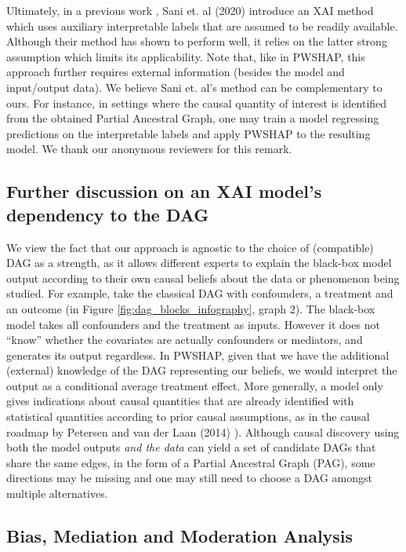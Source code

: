 \documentclass{article}
\theoremstyle{plain}
\theoremstyle{definition}
\theoremstyle{remark}
\theoremstyle{mystyle}
\begin{document}
Ultimately, in a previous work , Sani et. al  (2020) introduce an XAI method which uses auxiliary interpretable labels that are assumed to be readily available. Although their method has shown to perform well, it relies on the latter strong assumption which limits its applicability. Note that, like in PWSHAP, this approach further requires external information (besides the model and input/output data). We believe Sani et. al's method can be complementary to ours. For instance, in settings where the causal quantity of interest is identified from the obtained Partial Ancestral Graph, one may train a model regressing predictions on the interpretable labels and apply PWSHAP to the resulting model. We thank our anonymous reviewers for this remark.

\subsection{Further discussion on an XAI model's dependency to the DAG} 
\label{subsec:further_dag}

We view the fact that our approach is agnostic to the choice of (compatible) DAG as a strength, as it allows different experts to explain the black-box model output according to their own causal beliefs about the data or phenomenon being studied.
For example, take the classical DAG with confounders, a treatment and an outcome (in Figure \ref{fig:dag_blocks_infography}, graph 2). The black-box model takes all confounders and the treatment as inputs. However it does not ``know'' whether the covariates are actually confounders or mediators, and generates its output regardless. In PWSHAP, given that we have the additional (external) knowledge of the DAG representing our beliefs, we would interpret the output as a conditional average treatment effect. More generally, a model only gives indications about causal quantities that are already identified with statistical quantities according to prior causal assumptions, as in the causal roadmap by Petersen and van der Laan (2014) ). Although causal discovery using both the model outputs \textit{and the data} can yield a set of candidate DAGs that share the same edges, in the form of a Partial Ancestral Graph (PAG), some directions may be missing and one may still need to choose a DAG amongst multiple alternatives.

\subsection{Bias, Mediation and Moderation Analysis}
\label{sec:other_analyses}
\end{document}
